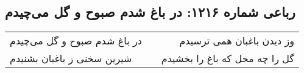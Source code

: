 \begin{center}
\section*{رباعی شماره ۱۲۱۶: در باغ شدم صبوح و گل می‌چیدم}
\label{sec:1216}
\begin{longtable}{l p{0.5cm} r}
در باغ شدم صبوح و گل می‌چیدم
&&
وز دیدن باغبان همی ترسیدم
\\
شیرین سخنی ز باغبان بشنیدم
&&
گل را چه محل که باغ را بخشیدم
\\
\end{longtable}
\end{center}

